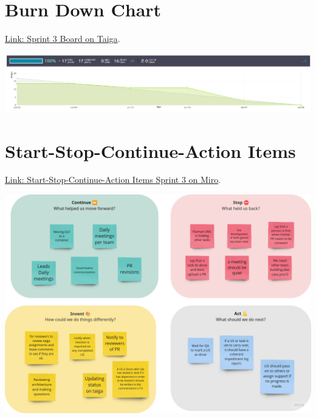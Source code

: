 \documentclass{article}
\begin{document}
\maketitle

\hypertarget{burndownchart-s3}{
\section{Burn Down Chart}\label{Burn Down Chart S3}}
\href{https://tree.taiga.io/project/joseluis-teran-coffeetime/taskboard/sprint-3-8974}{Link: Sprint 3 Board on Taiga}.

\includegraphics[width=\textwidth]{./assets/burndown-s3.png}

\hypertarget{startstopcontinueactionitems-s3}{
\section{Start-Stop-Continue-Action Items}\label{Start-Stop-Continue-Action Items S2}}
\href{https://miro.com/app/board/uXjVKDO7l8M=/?moveToWidget=3458764590247889881&cot=14}{Link: Start-Stop-Continue-Action Items Sprint 3 on Miro}.

\includegraphics[width=\textwidth]{./assets/retrospective-s3.png}
\end{document}
